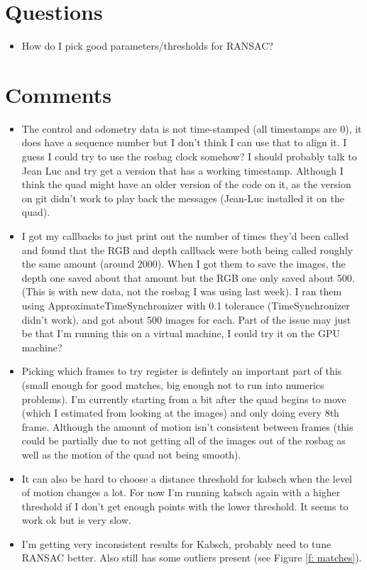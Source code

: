 \documentclass[12pt,a4paper]{article}
\begin{document}
\section{Questions}
\begin{itemize}
\item How do I pick good parameters/thresholds for RANSAC?
\end{itemize}

\section{Comments}
\begin{itemize}
\item The control and odometry data is not time-stamped (all timestamps are 0), it does have a sequence number but I don't think I can use that to align it. I guess I could try to use the rosbag clock somehow? I should probably talk to Jean Luc and try get a version that has a working timestamp. Although I think the quad might have an older version of the code on it, as the version on git didn't work to play back the messages (Jean-Luc installed it on the quad).
\item I got my callbacks to just print out the number of times they'd been called and found that the RGB and depth callback were both being called roughly the same amount (around 2000). When I got them to save the images, the depth one saved about that amount but the RGB one only saved about 500. (This is with new data, not the rosbag I was using last week). I ran them using ApproximateTimeSynchronizer with 0.1 tolerance (TimeSynchronizer didn't work), and got about 500 images for each. Part of the issue may just be that I'm running this on a virtual machine, I could try it on the GPU machine?
\item Picking which frames to try register is defintely an important part of this (small enough for good matches, big enough not to run into numerics problems). I'm currently starting from a bit after the quad begins to move (which I estimated from looking at the images) and only doing every 8th frame. Although the amount of motion isn't consistent between frames (this could be partially due to not getting all of the images out of the rosbag as well as the motion of the quad not being smooth).
\item It can also be hard to choose a distance threshold for kabsch when the level of motion changes a lot. For now I'm running kabsch again with a higher threshold if I don't get enough points with the lower threshold. It seems to work ok but is very slow.
\item I'm getting very inconsistent results for Kabsch, probably need to tune RANSAC better. Also still has some outliers present (see Figure \ref{f: matches}).
\end{itemize}
\end{document}
